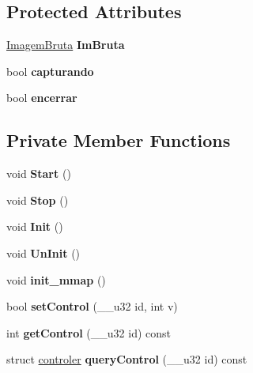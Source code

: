 \subsection*{Protected Attributes}
\begin{DoxyCompactItemize}
\item 
\hyperlink{classImagemBruta}{Imagem\+Bruta} {\bfseries Im\+Bruta}\hypertarget{classCamera_a13894c820cbf481aa9a819c5deed0521}{}\label{classCamera_a13894c820cbf481aa9a819c5deed0521}

\item 
bool {\bfseries capturando}\hypertarget{classCamera_a70a568ef2b25e3ac0d86bf7ff9ca32a2}{}\label{classCamera_a70a568ef2b25e3ac0d86bf7ff9ca32a2}

\item 
bool {\bfseries encerrar}\hypertarget{classCamera_a9f6fdc49fb03227375a2850b7c351f50}{}\label{classCamera_a9f6fdc49fb03227375a2850b7c351f50}

\end{DoxyCompactItemize}
\subsection*{Private Member Functions}
\begin{DoxyCompactItemize}
\item 
void {\bfseries Start} ()\hypertarget{classCamera_a758234ad0415d4072c69820c8e0f15a8}{}\label{classCamera_a758234ad0415d4072c69820c8e0f15a8}

\item 
void {\bfseries Stop} ()\hypertarget{classCamera_aba5fb6404d7d0876d428fc79b918d019}{}\label{classCamera_aba5fb6404d7d0876d428fc79b918d019}

\item 
void {\bfseries Init} ()\hypertarget{classCamera_a1543c3415858fa4773f8a69ef903366c}{}\label{classCamera_a1543c3415858fa4773f8a69ef903366c}

\item 
void {\bfseries Un\+Init} ()\hypertarget{classCamera_a4572da1f732efa4a4a468e455cf5242f}{}\label{classCamera_a4572da1f732efa4a4a468e455cf5242f}

\item 
void {\bfseries init\+\_\+mmap} ()\hypertarget{classCamera_a83bac8347403e471308f266c0b199b03}{}\label{classCamera_a83bac8347403e471308f266c0b199b03}

\item 
bool {\bfseries set\+Control} (\+\_\+\+\_\+u32 id, int v)\hypertarget{classCamera_a06e02ab83ca6313d367d98e0b014ad86}{}\label{classCamera_a06e02ab83ca6313d367d98e0b014ad86}

\item 
int {\bfseries get\+Control} (\+\_\+\+\_\+u32 id) const \hypertarget{classCamera_aa1cc5aa6f6f37433f78c6cfc9187e742}{}\label{classCamera_aa1cc5aa6f6f37433f78c6cfc9187e742}

\item 
struct \hyperlink{structcontroler}{controler} {\bfseries query\+Control} (\+\_\+\+\_\+u32 id) const \hypertarget{classCamera_a9af6989d5576502311741acaa8b79acd}{}\label{classCamera_a9af6989d5576502311741acaa8b79acd}

\end{DoxyCompactItemize}
